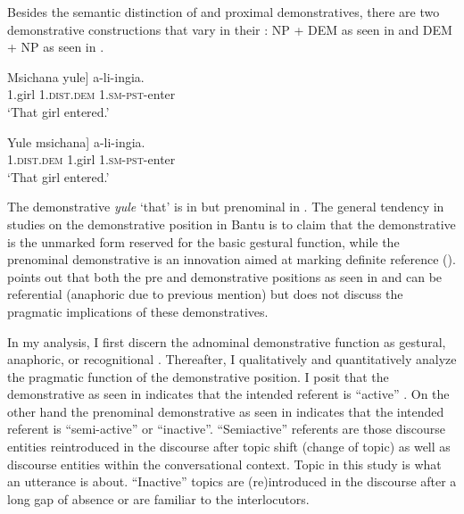 \documentclass[output=paper,
modfonts
]{langscibook}
\begin{document}
Besides the semantic distinction of  and proximal demonstratives, there are two demonstrative constructions that vary in their : NP + DEM as seen in  and DEM + NP as seen in .

\ea\label{ex:mwamzandi:1}
\gll {\ob}Msichana yule] a-li-ingia.\\
     {\db}1.girl \textsc{1.dist}.\textsc{dem} \textsc{1.sm}{}-\textsc{pst}{}-enter\\
\glt ‘That girl entered.’
\z

\ea\label{ex:mwamzandi:2}
\gll {\ob}Yule msichana] a-li-ingia.\\
     {\db}\textsc{1.dist}.\textsc{dem} 1.girl \textsc{1.sm}{}-\textsc{pst}{}-enter\\
\glt ‘That girl entered.’
\z

The  demonstrative \textit{yule} ‘that’ is  in  but prenominal in . The general tendency in studies on the demonstrative position in Bantu is to claim that the  demonstrative  is the unmarked form reserved for the basic gestural function, while the prenominal demonstrative  is an innovation aimed at marking definite reference (\citealt{Ashton1944,Carstens1991,Carstens2008,Tamanji2006}). \citet{Amidu2006} points out that both the pre and  demonstrative positions as seen in  and  can be referential (anaphoric due to previous mention) but does not discuss the pragmatic implications of these demonstratives.

In my analysis, I first discern the adnominal demonstrative function as gestural, anaphoric, or recognitional \citep{Fillmore19751971,Fillmore1982,Fillmore1997,Himmelmann1996,Diessel1999}. Thereafter, I qualitatively and quantitatively analyze the pragmatic function of the  demonstrative position. I posit that the  demonstrative as seen in  indicates that the intended referent is “active” \citep{Chafe1987}. On the other hand the prenominal demonstrative as seen in  indicates that the intended referent is “semi-active” or “inactive”. “Semiactive” referents are those discourse entities reintroduced in the discourse after topic shift (change of topic) as well as discourse entities within the conversational context. Topic in this study is what an utterance is about. “Inactive” topics are (re)introduced in the discourse after a long gap of absence or are familiar to the interlocutors.
\end{document}
